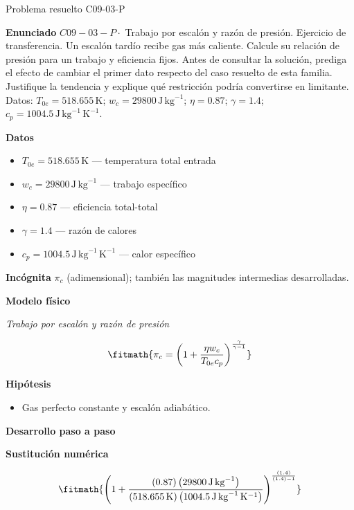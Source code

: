 \documentclass[10pt,openany]{book}
\begin{document}
\begin{studiumworked}{Problema resuelto C09-03-P}


\noindent\textbf{Enunciado}
\(C09-03-P \cdot\) Trabajo por escalón y razón de presión. Ejercicio de transferencia. Un escalón tardío recibe gas más caliente. Calcule su relación de presión para un trabajo y eficiencia fijos. Antes de consultar la solución, prediga el efecto de cambiar el primer dato respecto del caso resuelto de esta familia. Justifique la tendencia y explique qué restricción podría convertirse en limitante. Datos: \(T_{0e}=518.655\, \mathrm{K}\); \(w_c=29800\, \mathrm{J}\,\mathrm{kg}^{-1}\); \(\eta=0.87\); \(\gamma=1.4\); \(c_p=1004.5\, \mathrm{J}\,\mathrm{kg}^{-1}\,\mathrm{K}^{-1}\).

\noindent\textbf{Datos}
\begin{itemize}
\item $T_{0e} = 518.655\,\mathrm{K}$ — temperatura total entrada
\item $w_c = 29800\,\mathrm{J}\,\mathrm{kg}^{-1}$ — trabajo específico
\item $\eta = 0.87$ — eficiencia total-total
\item $\gamma = 1.4$ — razón de calores
\item $c_p = 1004.5\,\mathrm{J}\,\mathrm{kg}^{-1}\,\mathrm{K}^{-1}$ — calor específico
\end{itemize}

\noindent\textbf{Incógnita}
$\pi_c$ (adimensional); también las magnitudes intermedias desarrolladas.

\noindent\textbf{Modelo físico}

\noindent\textit{Trabajo por escalón y razón de presión}

\[
\fitmath{\pi_c=\left(1 + \frac{\eta w_c}{T_{0e} c_p}\right)^{\frac{\gamma}{\gamma - 1}}}
\]

\noindent\textbf{Hipótesis}
\begin{itemize}
\item Gas perfecto constante y escalón adiabático.
\end{itemize}

\noindent\textbf{Desarrollo paso a paso}



\noindent\textbf{Sustitución numérica}

\[
\fitmath{\left(1 + \frac{\left(0.87\right) \left(29800\,\mathrm{J}\,\mathrm{kg}^{-1}\right)}{\left(518.655\,\mathrm{K}\right) \left(1004.5\,\mathrm{J}\,\mathrm{kg}^{-1}\,\mathrm{K}^{-1}\right)}\right)^{\frac{\left(1.4\right)}{\left(1.4\right) - 1}}}
\]


\end{studiumworked}
\end{document}
